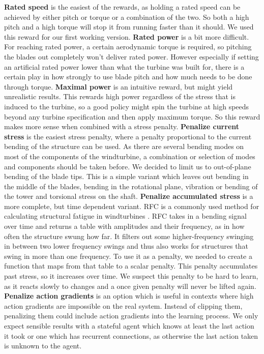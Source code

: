 \documentclass[hyperref,german,beleg]{cgvpub}
\begin{document}
\textbf{Rated speed} is the easiest of the rewards, as holding a rated speed can be achieved by either pitch or torque or a combination of the two. So both a high pitch and a high torque will stop it from running faster than it should. We used this reward for our first working version.
\textbf{Rated power} is a bit more difficult. For reaching rated power, a certain aerodynamic torque is required, so pitching the blades out completely won't deliver rated power. However especially if setting an artificial rated power lower than what the turbine was built for, there is a certain play in how strongly to use blade pitch and how much needs to be done through torque.
\textbf{Maximal power} is an intuitive reward, but might yield unrealistic results. This rewards high power regardless of the stress that is induced to the turbine, so a good policy might spin the turbine at high speeds beyond any turbine specification and then apply maximum torque. So this reward makes more sense when combined with a stress penalty.
\textbf{Penalize current stress} is the easiest stress penalty, where a penalty proportional to the current bending of the structure can be used. As there are several bending modes on most of the components of the windturbine, a combination or selection of modes and components should be taken before. We decided to limit us to out-of-plane bending of the blade tips. This is a simple variant which leaves out bending in the middle of the blades, bending in the rotational plane, vibration or bending of the tower and torsional stress on the shaft.
\textbf{Penalize accumulated stress} is a more complete, but time dependent variant. \ac{RFC} is a commonly used method for calculating structural fatigue in windturbines \cite{berglindFatigueEstimationMethods2014}. \ac{RFC} takes in a bending signal over time and returns a table with amplitudes and their frequency, as in how often the structure swung how far. It filters out some higher-frequency swinging in between two lower frequency swings and thus also works for structures that swing in more than one frequency. To use it as a penalty, we needed to create a function that maps from that table to a scalar penalty. This penalty accumulates past stress, so it increases over time. We suspect this penalty to be hard to learn, as it reacts slowly to changes and a once given penalty will never be lifted again.
\textbf{Penalize action gradients} is an option which is useful in contexts where high action gradients are impossible on the real system. Instead of clipping them, penalizing them could include action gradients into the learning process. We only expect sensible results with a stateful agent which knows at least the last action it took or one which has recurrent connections, as otherwise the last action taken is unknown to the agent.
\end{document}
